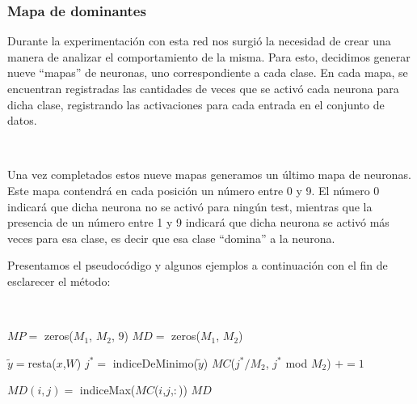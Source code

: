\documentclass[informe.tex]{subfiles}
\begin{document}
	\subsubsection{Mapa de dominantes}
      
	Durante la experimentación con esta red nos surgió la necesidad de crear una manera de analizar el comportamiento de la misma. Para esto, decidimos generar nueve ``mapas'' de neuronas, uno correspondiente a cada clase. En cada mapa, se encuentran registradas las cantidades de veces que se activó cada neurona para dicha clase, registrando las activaciones para cada entrada en el conjunto de datos.
	
	~
	
	Una vez completados estos nueve mapas generamos un \'ultimo mapa de neuronas. Este mapa contendr\'a en cada posición un número entre 0 y 9. El n\'umero 0 indicará que dicha neurona no se activó para ning\'un test, mientras que la presencia de un n\'umero entre 1 y 9 indicar\'a que dicha neurona se activó más veces para esa clase, es decir que esa clase ``domina'' a la neurona.
	
	\newpage
	
	Presentamos el pseudocódigo y algunos ejemplos a continuación con el fin de esclarecer el m\'etodo:
	
	~
	
	\begin{algorithmic}
	      \State $MP =$ zeros($M_1$, $M_2$, $9$)
	      \State $MD =$ zeros($M_1$, $M_2$)
	      
		\State $\tilde{y}= $resta($x$,$W$)
		\State $j^* =$ indiceDeMinimo($\tilde{y}$)
		\State $MC$($j^*/M_2$, $j^*$ mod $M_2$) $+= 1$ 
	      \EndFor
	      
		  \State $MD(i,j) =$ indiceMax($MC$($i$,$j$,$:$))
		\EndFor
	      \EndFor
	      \State \Return $MD$
	    \EndFunction
	  \end{algorithmic}
	  
	  
% 
	
\end{document}
